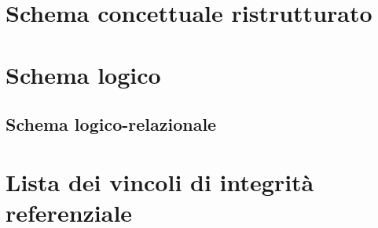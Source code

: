 \section{Schema concettuale ristrutturato}
\section{Schema logico}
\subsection{Schema logico-relazionale}
\section{Lista dei vincoli di integrità referenziale}
